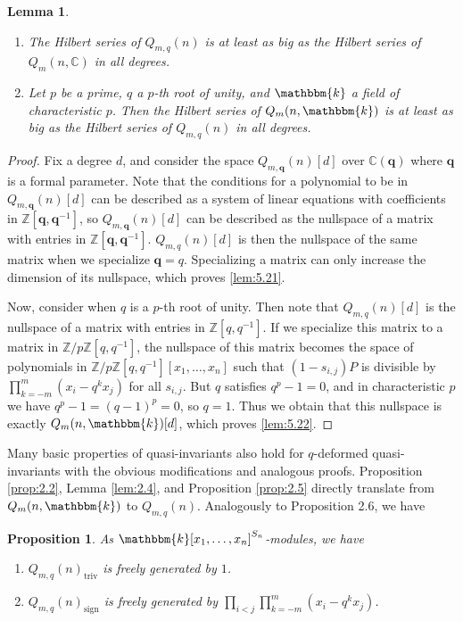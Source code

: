 \documentclass[11pt]{article}
\newtheorem{lemma}[theorem]{Lemma}
\newtheorem{proposition}[theorem]{Proposition}
\theoremstyle{definition}
\renewcommand{\k}{\mathbbm{k}}
\newcommand{\triv}{\mathrm{triv}}
\newcommand{\sgn}{\mathrm{sign}}
\newcommand{\C}{\mathbb{C}}
\renewcommand{\b}[1]{\textbf{#1}}
\newcommand{\Z}{\mathbb{Z}}
\begin{document}
\begin{lemma}
    \begin{enumerate}
        \item The Hilbert series of $Q_{m,q}(n)$ is at least as big as the Hilbert series of $Q_m(n,\C)$ in all degrees.\label{lem:5.21}
        \item Let $p$ be a prime, $q$ a $p$-th root of unity, and $\k$ a field of characteristic $p$. Then the Hilbert series of $Q_m(n,\k)$ is at least as big as the Hilbert series of $Q_{m,q}(n)$ in all degrees.\label{lem:5.22}
    \end{enumerate}
\end{lemma}
\begin{proof}
    Fix a degree $d$, and consider the space $Q_{m,\b{q}}(n)[d]$ over $\C(\b{q})$ where $\b{q}$ is a formal parameter. Note that the conditions for a polynomial to be in $Q_{m,\b{q}}(n)[d]$ can be described as a system of linear equations with coefficients in $\Z[\b{q},\b{q}^{-1}]$, so $Q_{m,\b{q}}(n)[d]$ can be described as the nullspace of a matrix with entries in $\Z[\b{q},\b{q}^{-1}]$. $Q_{m,q}(n)[d]$ is then the nullspace of the same matrix when we specialize $\b{q}=q$. Specializing a matrix can only increase the dimension of its nullspace, which proves \ref{lem:5.21}.
    
    Now, consider when $q$ is a $p$-th root of unity. Then note that $Q_{m,q}(n)[d]$ is the nullspace of a matrix with entries in $\Z[q,q^{-1}]$. If we specialize this matrix to a matrix in $\Z/p\Z[q,q^{-1}]$, the nullspace of this matrix becomes the space of polynomials in $\Z/p\Z[q,q^{-1}][x_1,\dots,x_n]$ such that $(1-s_{i,j})P$ is divisible by ${\prod_{k=-m}^m(x_i-q^kx_j)}$ for all $s_{i,j}$. But $q$ satisfies $q^p-1=0$, and in characteristic $p$ we have $q^p-1=(q-1)^p=0$, so $q=1$. Thus we obtain that this nullspace is exactly $Q_m(n,\k)[d]$, which proves \ref{lem:5.22}.
\end{proof}

Many basic properties of quasi-invariants also hold for $q$-deformed quasi-invariants with the obvious modifications and analogous proofs. Proposition \ref{prop:2.2}, Lemma \ref{lem:2.4}, and Proposition \ref{prop:2.5} directly translate from $Q_m(n,\k)$ to $Q_{m,q}(n)$. Analogously to Proposition 2.6, we have

\begin{proposition}\label{prop:5.3}
    As $\k[x_1,\dots,x_n]^{S_n}$-modules, we have
    \begin{enumerate}
        \item $Q_{m,q}(n)_\triv$ is freely generated by $1$.
        \item $Q_{m,q}(n)_\sgn$ is freely generated by $\prod_{i<j}\prod_{k=-m}^m(x_i-q^kx_j)$.
    \end{enumerate}
\end{proposition}
\end{document}
